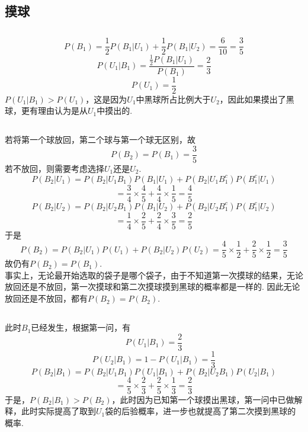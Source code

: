 \documentclass{article}
\begin{document}
\begin{CJK}{UTF8}{gbsn}
\section{摸球}
\subsection{}
$$ P(B_{1})=\frac{1}{2}P(B_{1}|U_{1})+\frac{1}{2}P(B_{1}|U_{2})=\frac{6}{10}=\frac{3}{5} $$
$$ P(U_{1}|B_{1})=\frac{\frac{1}{2}P(B_{1}|U_{1})}{P(B_{1})}=\frac{2}{3} $$
$$ P(U_{1})=\frac{1}{2} $$
$P(U_{1}|B_{1})>P(U_{1})$，这是因为$U_{1}$中黑球所占比例大于$U_{2}$，因此如果摸出了黑球，更有理由认为是从$U_{1}$中摸出的.
\subsection{}
若将第一个球放回，第二个球与第一个球无区别，故
$$ P(B_{2})=P(B_{1})=\frac{3}{5} $$
若不放回，则需要考虑选择$U_{1}$还是$U_{2}$.
$$ P(B_{2}|U_{1})=P(B_{2}|U_{1}B_{1})P(B_{1}|U_{1})+P(B_{2}|U_{1}B_{1}^{c})P(B_{1}^{c}|U_{1}) $$
$$ =\frac{3}{4}\times \frac{4}{5}+\frac{4}{4}\times \frac{1}{5}=\frac{4}{5} $$
$$ P(B_{2}|U_{2})=P(B_{2}|U_{2}B_{1})P(B_{1}|U_{2})+P(B_{2}|U_{2}B_{1}^{c})P(B_{1}^{c}|U_{2}) $$
$$ =\frac{1}{4}\times \frac{2}{5}+\frac{2}{4}\times \frac{3}{5}=\frac{2}{5} $$
于是
$$ P(B_{2})=P(B_{2}|U_{1})P(U_{1})+P(B_{2}|U_{2})P(U_{2})=\frac{4}{5}\times \frac{1}{2}+\frac{2}{5}\times \frac{1}{2}=\frac{3}{5}$$
故仍有$P(B_{2})=P(B_{1})$.
\\事实上，无论最开始选取的袋子是哪个袋子，由于不知道第一次摸球的结果，无论放回还是不放回，第一次摸球和第二次摸球摸到黑球的概率都是一样的. 因此无论放回还是不放回，都有$P(B_{2})=P(B_{2})$.
\subsection{}
此时$B_{1}$已经发生，根据第一问，有
$$P(U_{1}|B_{1})=\frac{2}{3}$$
$$P(U_{2}|B_{1})=1-P(U_{1}|B_{1})=\frac{1}{3}$$
$$P(B_{2}|B_{1})=P(B_{2}|U_{1}B_{1})P(U_{1}|B_{1})+P(B_{2}|U_{2}B_{1})P(U_{2}|B_{1})$$
$$ =\frac{4}{5}\times \frac{2}{3}+\frac{2}{5}\times \frac{1}{3}=\frac{2}{3} $$
于是，$P(B_{2}|B_{1})>P(B_{2})$，此时因为已知第一个球摸出黑球，第一问中已做解释，此时实际提高了取到$U_{1}$袋的后验概率，进一步也就提高了第二次摸到黑球的概率.

\end{CJK}
\end{document}
